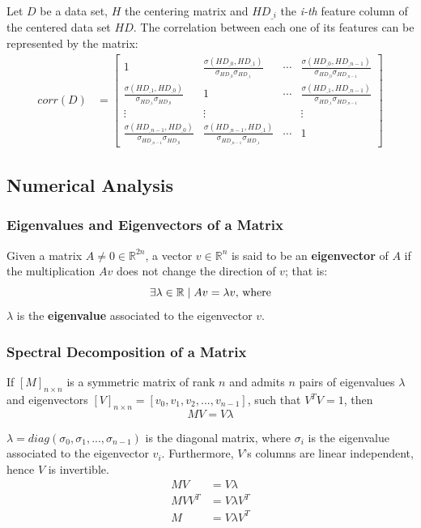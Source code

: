 \documentclass[12pt]{article}
\begin{document}
Let $D$ be a data set, $H$ the centering matrix and $HD_{\_i}$ the {\em i-th} feature column of the centered data set $HD$. The correlation between each one of its features can be represented by the matrix:
\begin{align*}
	corr(D) &= \begin{bmatrix}
		1 & \frac{\sigma(HD_{\_0}, HD_{\_1})}{\sigma_{HD_{\_0}} \sigma_{HD_{\_1}}} & \cdots & \frac{\sigma(HD_{\_0}, HD_{\_n-1})}{\sigma_{HD_{\_0}} \sigma_{HD_{\_n-1}}} \\
		\frac{\sigma(HD_{\_1}, HD_{\_0})}{\sigma_{HD_{\_1}} \sigma_{HD_{\_0}}} & 1 & \cdots & \frac{\sigma(HD_{\_1}, HD_{\_n-1})}{\sigma_{HD_{\_1}} \sigma_{HD_{\_n-1}}} \\
		\vdots & \vdots && \vdots \\
		\frac{\sigma(HD_{\_n-1}, HD_{\_0})}{\sigma_{HD_{\_n-1}} \sigma_{HD_{\_0}}} & \frac{\sigma(HD_{\_n-1}, HD_{\_1})}{\sigma_{HD_{\_n-1}} \sigma_{HD_{\_1}}} & \cdots & 1
	\end{bmatrix}
\end{align*}

\subsection{Numerical Analysis}
\subsubsection{Eigenvalues and Eigenvectors of a Matrix}

Given a matrix $A \ne 0 \in \mathbb{R}^{2n}$, a vector $v \in \mathbb{R}^n$ is said to be an \textbf{eigenvector} of $A$ if the multiplication $Av$ does not change the direction of $v$; that is:
$$\exists \lambda \in \mathbb{R} \mid Av = \lambda v \textnormal{, where}$$
$\lambda$ is the \textbf{eigenvalue} associated to the eigenvector $v$.

\subsubsection{Spectral Decomposition of a Matrix}

If $[M]_{n\times n}$ is a symmetric matrix of rank $n$ and admits $n$ pairs of eigenvalues $\lambda$ and eigenvectors $[V]_{n\times n} = [v_0, v_1, v_2, ..., v_{n-1}]$, such that $V^TV = 1$, then
$$MV = V \lambda$$

$\lambda = diag(\sigma_0, \sigma_1, ..., \sigma_{n-1})$ is the diagonal matrix, where $\sigma_i$ is the eigenvalue associated to the eigenvector $v_i$. \cite{cox2001} Furthermore, $V$'s columns are linear independent, hence $V$ is invertible.
\begin{align*}
	MV &= V \lambda \\
	MVV^T &= V \lambda V^T \\
	M &= V \lambda V^T
\end{align*}
\end{document}
